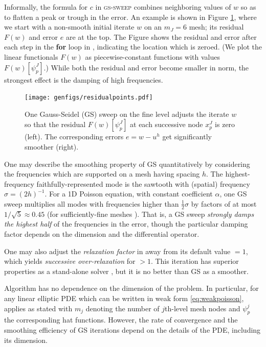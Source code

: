 \documentclass[letterpaper,final,12pt,reqno]{amsart}
\theoremstyle{claim}
\numberwithin{equation}{section}
\numberwithin{figure}{section}
\numberwithin{table}{section}
\numberwithin{theorem}{section}
\begin{document}
Informally, the formula for $c$ in \textsc{gs-sweep} combines neighboring values of $w$ so as to flatten a peak or trough in the error.  An example is shown in Figure \ref{fig:residualpoints}, where we start with a non-smooth initial iterate $w$ on an $m_J=6$ mesh; its residual $F(w)$ and error $e$ are at the top.  The Figure shows the residual and error after each step in the \textbf{for} loop in , indicating the location which is zeroed.  (We plot the linear functionals $F(w)$ as piecewise-constant functions with values $F(w)[\psi_p^J]$.)  While both the residual and error become smaller in norm, the strongest effect is the damping of high frequencies.

\begin{figure}[t]
\texttt{[image: genfigs/residualpoints.pdf]}
\caption{One Gauss-Seidel (GS) sweep on the fine level adjusts the iterate $w$ so that the residual $F(w)[\psi_p^J]$ at each successive node $x_p^J$ is zero (left).  The corresponding errors $e=w-u^h$ get significantly smoother (right).}
\label{fig:residualpoints}
\end{figure}

One may describe the smoothing property of GS quantitatively by considering the frequencies which are supported on a mesh having spacing $h$.  The highest-frequency faithfully-represented mode is the sawtooth with (spatial) frequency $\sigma=(2h)^{-1}$.  For a 1D Poisson equation, with constant coefficient $\alpha$, one GS sweep multiplies all modes with frequencies higher than $\frac{1}{2} \sigma$ by factors of at most $1/\sqrt{5}\approx 0.45$ (for sufficiently-fine meshes \cite[Chapter 4]{Briggsetal2000}).  That is, a GS sweep \emph{strongly damps the highest half} of the frequencies in the error, though the particular damping factor depends on the dimension and the differential operator.

One may also adjust the \emph{relaxation factor}  in  away from its default value  $=1$, which yields \emph{successive over-relaxation} for  $>1$.  This iteration has superior properties as a stand-alone solver \cite{Greenbaum1997}, but it is no better than GS as a smoother.

Algorithm  has no dependence on the dimension of the problem.  In particular, for any linear elliptic PDE which can be written in weak form \eqref{eq:weakpoisson},  applies as stated with $m_j$ denoting the number of $j$th-level mesh nodes and $\psi_p^j$ the corresponding hat functions.  However, the rate of convergence and the smoothing efficiency of GS iterations depend on the details of the PDE, including its dimension.
\end{document}
